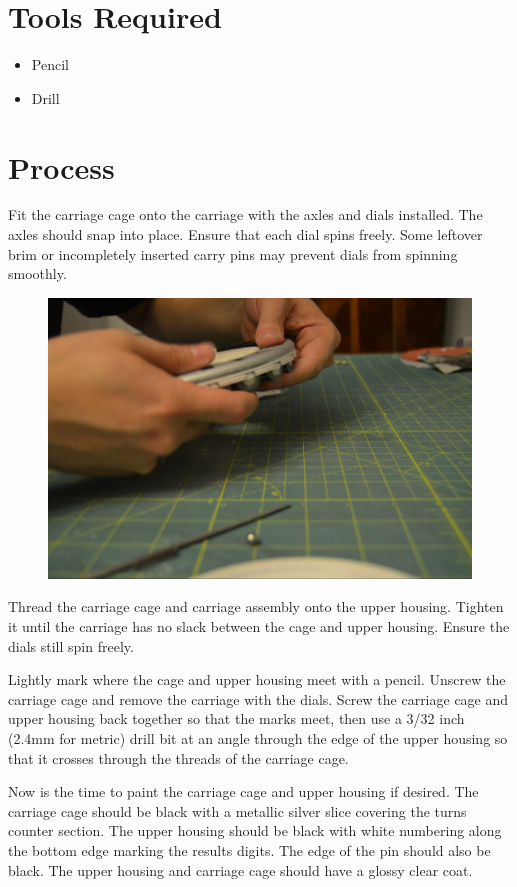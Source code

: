 \documentclass[openany]{book}
\begin{document}
\section{Tools Required}
\begin{itemize}
	\item Pencil
	\item Drill
\end{itemize}

\section{Process}
Fit the carriage cage onto the carriage with the axles and dials installed. The axles should snap into place. Ensure that each dial spins freely. Some leftover brim or incompletely inserted carry pins may prevent dials from spinning smoothly.


\begin{figure}[!ht]
	\centering
	\includegraphics[width=.75\textwidth]{images/image1.jpg}
	\caption{}
	\label{fig:image1}	
\end{figure}

Thread the carriage cage and carriage assembly onto the upper housing. Tighten it until the carriage has no slack between the cage and upper housing. Ensure the dials still spin freely.

Lightly mark where the cage and upper housing meet with a pencil. Unscrew the carriage cage and remove the carriage with the dials. Screw the carriage cage and upper housing back together so that the marks meet, then use a 3/32 inch (2.4mm for metric) drill bit at an angle through the edge of the upper housing so that it crosses through the threads of the carriage cage.

Now is the time to paint the carriage cage and upper housing if desired. The carriage cage should be black with a metallic silver slice covering the turns counter section. The upper housing should be black with white numbering along the bottom edge marking the results digits. The edge of the pin should also be black. The upper housing and carriage cage should have a glossy clear coat.
\end{document}
